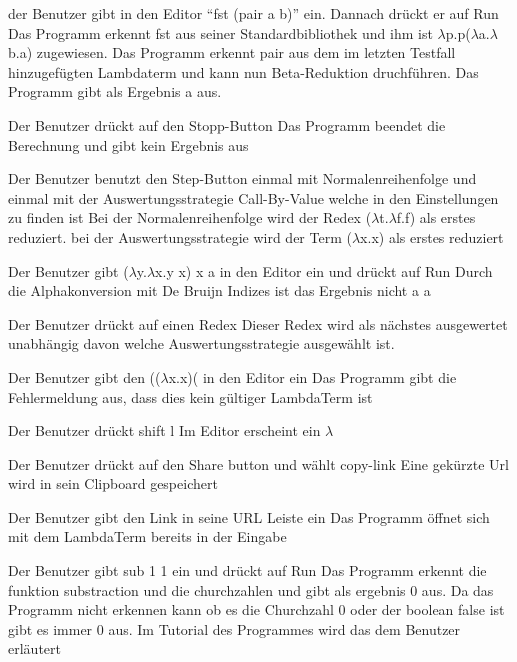 \documentclass[parskip=full,11pt,twoside]{scrartcl}
\begin{document}
{ der Benutzer gibt in den Editor \enquote {fst (pair a b)} ein. Dannach drückt er auf Run}
{ Das Programm erkennt fst aus seiner Standardbibliothek und ihm ist $\lambda$p.p($\lambda$a.$\lambda$b.a) zugewiesen. Das Programm erkennt pair aus dem im letzten Testfall hinzugefügten Lambdaterm und kann nun Beta-Reduktion druchführen. Das Programm gibt als Ergebnis a aus.}

{Der Benutzer drückt auf den Stopp-Button}
{ Das Programm beendet die Berechnung und gibt kein Ergebnis aus }

{Der Benutzer benutzt den Step-Button einmal mit Normalenreihenfolge  und einmal mit der Auswertungsstrategie Call-By-Value welche in den Einstellungen zu finden ist}
{ Bei der Normalenreihenfolge wird der Redex ($\lambda$t.$\lambda$f.f) als erstes reduziert. bei der Auswertungsstrategie wird der Term ($\lambda$x.x) als erstes reduziert }

{ Der Benutzer gibt ($\lambda$y.$\lambda$x.y x) x a in den Editor ein und drückt auf Run}
{ Durch die Alphakonversion mit De Bruijn Indizes ist das Ergebnis nicht a  a  } 

 { Der Benutzer drückt auf einen Redex}
{ Dieser Redex wird als nächstes ausgewertet unabhängig davon welche Auswertungsstrategie ausgewählt ist. }

{ Der Benutzer gibt den (($\lambda$x.x)( in den Editor ein }
{ Das Programm gibt die Fehlermeldung aus, dass dies kein gültiger LambdaTerm ist }

{ Der Benutzer drückt shift l }
{Im Editor erscheint ein $\lambda$}

{ Der Benutzer drückt auf den Share button und wählt copy-link}
{ Eine gekürzte Url wird in sein Clipboard gespeichert }

{Der Benutzer gibt den Link in seine URL Leiste ein }
{ Das Programm öffnet sich mit dem LambdaTerm bereits in der Eingabe }

{ Der Benutzer gibt sub 1 1 ein und drückt auf Run }
{ Das Programm erkennt die funktion substraction und die churchzahlen und gibt als ergebnis 0 aus. Da das Programm nicht erkennen kann ob es die Churchzahl 0 oder der boolean false ist gibt es immer 0 aus. Im Tutorial des Programmes wird das dem Benutzer erläutert }
\end{document}
